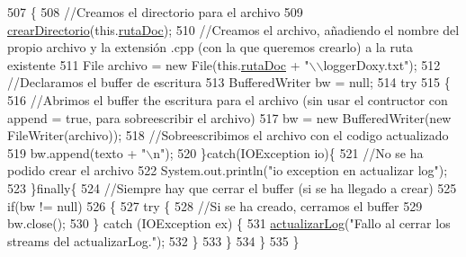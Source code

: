 \begin{DoxyCode}
507                                             \{
508         \textcolor{comment}{//Creamos el directorio para el archivo}
509         \mbox{\hyperlink{classactualizadordoxy_1_1_actualizador_doxy_a7d8af20d53904ac818f04740c5264d9f}{crearDirectorio}}(this.\mbox{\hyperlink{classactualizadordoxy_1_1_actualizador_doxy_a5655cc699bfc4a0b01432170892663d8}{rutaDoc}});
510         \textcolor{comment}{//Creamos el archivo, añadiendo el nombre del propio archivo y la extensión .cpp (con la que
       queremos crearlo) a la ruta existente}
511         File archivo = \textcolor{keyword}{new} File(this.\mbox{\hyperlink{classactualizadordoxy_1_1_actualizador_doxy_a5655cc699bfc4a0b01432170892663d8}{rutaDoc}} + \textcolor{stringliteral}{"\(\backslash\)\(\backslash\)loggerDoxy.txt"});
512         \textcolor{comment}{//Declaramos el buffer de escritura}
513         BufferedWriter bw = null;
514         \textcolor{keywordflow}{try}
515         \{
516             \textcolor{comment}{//Abrimos el buffer the escritura para el archivo (sin usar el contructor con append = true,
       para sobreescribir el archivo)}
517             bw = \textcolor{keyword}{new} BufferedWriter(\textcolor{keyword}{new} FileWriter(archivo));
518             \textcolor{comment}{//Sobreescribimos el archivo con el codigo actualizado}
519             bw.append(texto + \textcolor{stringliteral}{"\(\backslash\)n"});
520         \}\textcolor{keywordflow}{catch}(IOException io)\{
521             \textcolor{comment}{//No se ha podido crear el archivo}
522             System.out.println(\textcolor{stringliteral}{"io exception en actualizar log"});
523         \}\textcolor{keywordflow}{finally}\{
524             \textcolor{comment}{//Siempre hay que cerrar el buffer (si se ha llegado a crear)}
525             \textcolor{keywordflow}{if}(bw != null)
526             \{
527                 \textcolor{keywordflow}{try} \{
528                     \textcolor{comment}{//Si se ha creado, cerramos el buffer}
529                     bw.close();
530                 \} \textcolor{keywordflow}{catch} (IOException ex) \{
531                     \mbox{\hyperlink{classactualizadordoxy_1_1_actualizador_doxy_a1ad41046efbaaf40a60b34da347f9090}{actualizarLog}}(\textcolor{stringliteral}{"Fallo al cerrar los streams del actualizarLog."});
532                 \}
533             \}
534         \}
535     \}    
\end{DoxyCode}
\mbox{\label{classactualizadordoxy_1_1_actualizador_doxy_a19ee42edb9fe87c54d8581bc1a37ed77}} 
